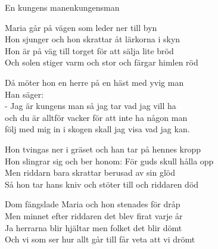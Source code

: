 \begin{song}{En kungens man}{enkungensman}
\begin{vers}
Maria går på vägen som leder ner till byn\\
Hon sjunger och hon skrattar åt lärkorna i skyn\\
Hon är på väg till torget för att sälja lite bröd\\
Och solen stiger varm och stor och färgar himlen röd\\
\end{vers}
\begin{vers}
Då möter hon en herre på en häst med yvig man\\
Han säger:\\
- Jag är kungens man så jag tar vad jag vill ha\\
och du är alltför vacker för att inte ha någon man\\
följ med mig in i skogen skall jag visa vad jag kan.\\
\end{vers}
\begin{vers}
Hon tvingas ner i gräset och han tar på hennes kropp\\
Hon slingrar sig och ber honom: För guds skull hålla opp\\
Men riddarn bara skrattar berusad av sin glöd\\
Så hon tar hans kniv och stöter till och riddaren död\\
\end{vers}
\begin{vers}
Dom fängslade Maria och hon stenades för dråp\\
Men minnet efter riddaren det blev firat varje år\\
Ja herrarna blir hjältar men folket det blir dömt\\
Och vi som ser hur allt går till får veta att vi drömt\\
\end{vers}
\end{song}
